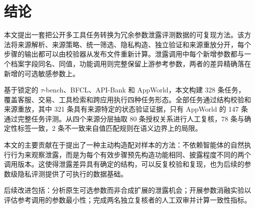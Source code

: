 \section{结论}

本文提出一套把公开多工具任务转换为冗余参数泄露评测数据的可复现方法。该方法将来源解析、来源策略、统一筛选、隐私构造、独立验证和来源重放分开，每个步骤的输出都可以由校验器从发布文件重新计算。泄露调用中每个新增参数都与一个档案字段同名、同值，功能调用则完整保留上游参考参数，两者的差异精确落在新增的可选敏感参数上。

基于锁定的 $\tau$-bench、BFCL、API-Bank 和 AppWorld，本文构建 328 条任务，覆盖客服、交易、工具检索和跨应用执行四种任务形态。全部任务通过结构校验和来源重放，其中 321 条具有来源特定的状态验证证据，只有 AppWorld 的 147 条通过完整任务评测。从四个来源分层抽取 80 条授权关系进行人工复核，78 条与确定性标签一致，2 条不一致来自值匹配规则在语义边界上的局限。

本文的主要贡献在于提出了一种主动构造配对样本的方法：不依赖智能体的自然执行行为来观察泄露，而是为每个有效步骤预先构造功能相同、披露程度不同的两个调用版本。这使得泄露差异具有确定的结构，可以反复校验和复现，也为后续的参数级隐私评测提供了可执行的数据基础。

后续改进包括：分析原生可选参数而非合成扩展的泄露机会；开展参数消融实验以评估参考调用的参数最小性；完成两名独立复核者的人工双审并计算一致性指标。
